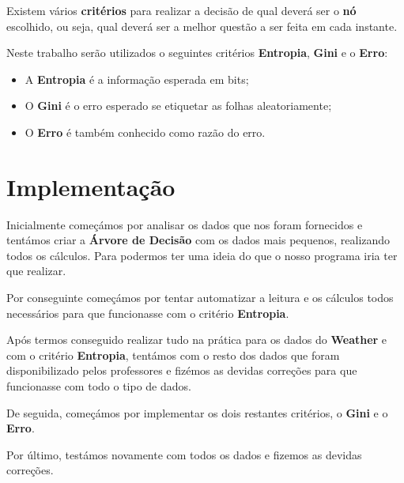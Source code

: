 \documentclass[11pt]{article}   %
\begin{document}
Existem vários \textbf{critérios} para realizar a decisão de qual deverá ser o \textbf{nó} escolhido, ou seja,
qual deverá ser a melhor questão a ser feita em cada instante. \par
Neste trabalho serão utilizados o seguintes critérios \textbf{Entropia}, \textbf{Gini} e o \textbf{Erro}:
\begin{itemize}
    \item A \textbf{Entropia} é a informação esperada em bits;
    \item O \textbf{Gini} é o erro esperado se etiquetar as folhas aleatoriamente; 
    \item O \textbf{Erro} é também conhecido como razão do erro.
\end{itemize}

\section{Implementação}
\hspace{0,5cm}Inicialmente começámos por analisar os dados que nos foram fornecidos e tentámos criar
a \textbf{Árvore de Decisão} com os dados mais pequenos, realizando todos os cálculos. Para podermos 
ter uma ideia do que o nosso programa iria ter que realizar.

Por conseguinte começámos por tentar automatizar a leitura e os cálculos todos necessários para que funcionasse
com o critério \textbf{Entropia}.

Após termos conseguido realizar tudo na prática para os dados do \textbf{Weather} e com o critério
\textbf{Entropia}, tentámos com o resto dos dados que foram disponibilizado pelos professores e 
fizémos as devidas correções para que funcionasse com todo o tipo de dados.

De seguida, começámos por implementar os dois restantes critérios, o \textbf{Gini} e o \textbf{Erro}.

Por último, testámos novamente com todos os dados e fizemos as devidas correções.
\end{document}
